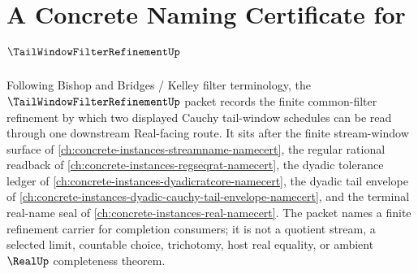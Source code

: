 \chapter{A Concrete Naming Certificate for $\TailWindowFilterRefinementUp$}
\label{ch:concrete-instances-tail-window-filter-refinement-namecert}

Following Bishop and Bridges / Kelley filter terminology, the $\TailWindowFilterRefinementUp$ packet records the finite common-filter refinement by which two displayed Cauchy tail-window schedules can be read through one downstream Real-facing route. It sits after the finite stream-window surface of \autoref{ch:concrete-instances-streamname-namecert}, the regular rational readback of \autoref{ch:concrete-instances-regseqrat-namecert}, the dyadic tolerance ledger of \autoref{ch:concrete-instances-dyadicratcore-namecert}, the dyadic tail envelope of \autoref{ch:concrete-instances-dyadic-cauchy-tail-envelope-namecert}, and the terminal real-name seal of \autoref{ch:concrete-instances-real-namecert}. The packet names a finite refinement carrier for completion consumers; it is not a quotient stream, a selected limit, countable choice, trichotomy, host real equality, or ambient $\RealUp$ completeness theorem.

